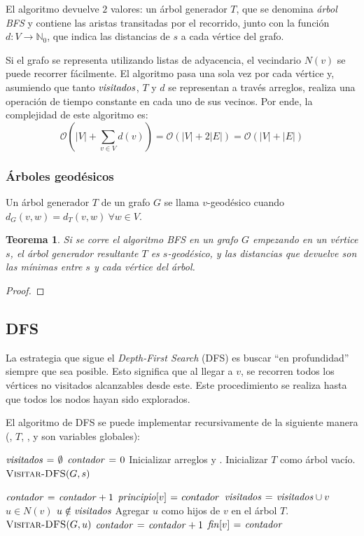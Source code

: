 \documentclass[a4paper]{report}
\newcommand{\BigO}[1]{\ensuremath{\mathcal{O}(#1)}}
\newcommand{\N}{\mathbb{N}}
\newcommand{\Each}{\kw{each}\ }
\newtheorem*{theorem*}{Teorema}
\begin{document}
El algoritmo devuelve $2$ valores: un árbol generador $T$, que se denomina \textit{árbol BFS} y contiene las aristas transitadas por el recorrido, junto con la función $d: V \longrightarrow \N_0$, que indica las distancias de $s$ a cada vértice del grafo.

Si el grafo se representa utilizando listas de adyacencia, el vecindario $N(v)$ se puede recorrer fácilmente. El algoritmo pasa una sola vez por cada vértice y, asumiendo que tanto $\id{visitados}$, $T$ y $d$ se representan a través arreglos, realiza una operación de tiempo constante en cada uno de sus vecinos. Por ende, la complejidad de este algoritmo es:
$$\BigO{|V| + \sum_{v \in V} d(v)} = \BigO{|V| + 2|E|} = \BigO{|V| + |E|}$$

\subsubsection{Árboles geodésicos}

Un árbol generador $T$ de un grafo $G$ se llama $v$-geodésico cuando $d_G(v, w) = d_T(v, w)\ \forall w \in V$.
\begin{theorem*}
    Si se corre el algoritmo BFS en un grafo $G$ empezando en un vértice $s$, el árbol generador resultante $T$ es $s$-geodésico, y las distancias que devuelve son las mínimas entre $s$ y cada vértice del árbol.
\end{theorem*}
\begin{proof}
\end{proof}

\subsection{DFS}

La estrategia que sigue el \textit{Depth-First Search} (DFS) es buscar ``en profundidad'' siempre que sea posible. Esto significa que al llegar a $v$, se recorren todos los vértices no visitados alcanzables desde este. Este procedimiento se realiza hasta que todos los nodos hayan sido explorados.

El algoritmo de DFS se puede implementar recursivamente de la siguiente manera (, $T$, ,  y  son variables globales):

\begin{codebox}
    \li $\id{visitados} \gets \emptyset$
    \li $\id{contador} \gets 0$
    \li Inicializar arreglos  y .
    \li Inicializar $T$ como árbol vacío.
    \li $\textnormal{\scshape Visitar-DFS}(G, s)$
\end{codebox}
\label{dfs-visit}
\begin{codebox}
    \li $\id{contador} \gets \id{contador} + 1$
    \li $\id{principio}[v] \gets contador$
    \li $\id{visitados} \gets \id{visitados} \cup v$
    \li \For \Each $u \in N(v)$ \Do
    \li \If $u \notin \id{visitados}$
    \li Agregar $u$ como hijos de $v$ en el árbol $T$.
    \li $\textnormal{\scshape Visitar-DFS}(G, u)$
    \End
    \End
    \li $\id{contador} \gets \id{contador} + 1$
    \li $\id{fin}[v] \gets \id{contador}$
\end{codebox}
\end{document}
